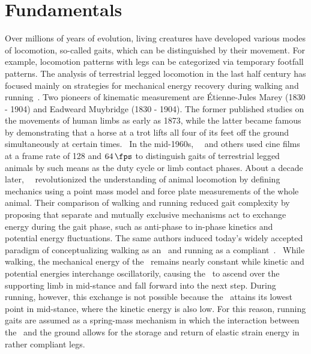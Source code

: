 \chapter{Fundamentals}
\label{sec:fundamentals}

Over millions of years of evolution, living creatures have developed various modes of locomotion, so-called gaits, which can be distinguished by their movement. For example, locomotion patterns with legs can be categorized via temporary footfall patterns. The analysis of terrestrial legged locomotion in the last half century has focused mainly on strategies for mechanical energy recovery during walking and running~\cite{Lee2011}. Two pioneers of kinematic measurement are {\'E}tienne-Jules Marey (1830 - 1904) and Eadweard Muybridge (1830 - 1904). The former published studies on the movements of human limbs as early as 1873, while the latter became famous by demonstrating that a horse at a trot lifts all four of its feet off the ground simultaneously at certain times.~\cite{Baker2007} In the mid-1960s,~\citeauthor{Hildebrand1965}~\cite{Hildebrand1965} and others used cine films at a frame rate of 128 and $64\,\textrm{\si{\fps}}$ to distinguish gaits of terrestrial legged animals by such means as the duty cycle or limb contact phases. About a decade later,~\citeauthor{Cavagna1977}~\cite{Cavagna1977} revolutionized the understanding of animal locomotion by defining~ mechanics using a point mass model and force plate measurements of the whole animal. Their comparison of walking and running reduced gait complexity by proposing that separate and mutually exclusive mechanisms act to exchange energy during the gait phase, such as anti-phase to in-phase kinetics and potential energy fluctuations. The same authors induced today's widely accepted paradigm of conceptualizing walking as an~ and running as a compliant~.~\cite{Lee2013} While walking, the mechanical energy of the~ remains nearly constant while kinetic and potential energies interchange oscillatorily, causing the~ to ascend over the supporting limb in mid-stance and fall forward into the next step. During running, however, this exchange is not possible because the~ attains its lowest point in mid-stance, where the kinetic energy is also low. For this reason, running gaits are assumed as a spring-mass mechanism in which the interaction between the~ and the ground allows for the storage and return of elastic strain energy in rather compliant legs.~\cite{Lee2011}

